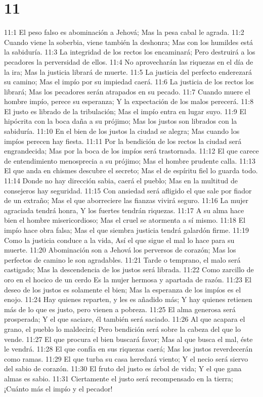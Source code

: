 \chapter{11}


11:1 El peso falso es abominación a Jehová;  
Mas la pesa cabal le agrada.  
11:2 Cuando viene la soberbia, viene también la deshonra;  
Mas con los humildes está la sabiduría.  
11:3 La integridad de los rectos los encaminará;  
Pero destruirá a los pecadores la perversidad de ellos.  
11:4 No aprovecharán las riquezas en el día de la ira;  
Mas la justicia librará de muerte.  
11:5 La justicia del perfecto enderezará su camino;  
Mas el impío por su impiedad caerá.  
11:6 La justicia de los rectos los librará;  
Mas los pecadores serán atrapados en su pecado.  
11:7 Cuando muere el hombre impío, perece su esperanza;  
Y la expectación de los malos perecerá.  
11:8 El justo es librado de la tribulación;  
Mas el impío entra en lugar suyo.  
11:9 El hipócrita con la boca daña a su prójimo;  
Mas los justos son librados con la sabiduría.  
11:10 En el bien de los justos la ciudad se alegra;  
Mas cuando los impíos perecen hay fiesta.  
11:11 Por la bendición de los rectos la ciudad será engrandecida;  
Mas por la boca de los impíos será trastornada.  
11:12 El que carece de entendimiento menosprecia a su prójimo;  
Mas el hombre prudente calla.  
11:13 El que anda en chismes descubre el secreto;  
Mas el de espíritu fiel lo guarda todo.  
11:14 Donde no hay dirección sabia, caerá el pueblo;  
Mas en la multitud de consejeros hay seguridad.  
11:15 Con ansiedad será afligido el que sale por fiador de un extraño;  
Mas el que aborreciere las fianzas vivirá seguro.  
11:16 La mujer agraciada tendrá honra,  
Y los fuertes tendrán riquezas.  
11:17 A su alma hace bien el hombre misericordioso;  
Mas el cruel se atormenta a sí mismo.  
11:18 El impío hace obra falsa;  
Mas el que siembra justicia tendrá galardón firme.  
11:19 Como la justicia conduce a la vida,  
Así el que sigue el mal lo hace para su muerte.  
11:20 Abominación son a Jehová los perversos de corazón; 
Mas los perfectos de camino le son agradables.  
11:21 Tarde o temprano, el malo será castigado;  
Mas la descendencia de los justos será librada.  
11:22 Como zarcillo de oro en el hocico de un cerdo  
Es la mujer hermosa y apartada de razón.  
11:23 El deseo de los justos es solamente el bien;  
Mas la esperanza de los impíos es el enojo.  
11:24 Hay quienes reparten, y les es añadido más;  
Y hay quienes retienen más de lo que es justo, pero vienen a pobreza.  
11:25 El alma generosa será prosperada;  
Y el que saciare, él también será saciado.  
11:26 Al que acapara el grano, el pueblo lo maldecirá;  
Pero bendición será sobre la cabeza del que lo vende.  
11:27 El que procura el bien buscará favor;  
Mas al que busca el mal, éste le vendrá.  
11:28 El que confía en sus riquezas caerá;  
Mas los justos reverdecerán como ramas.  
11:29 El que turba su casa heredará viento; 
Y el necio será siervo del sabio de corazón.  
11:30 El fruto del justo es árbol de vida;  
Y el que gana almas es sabio.  
11:31 Ciertamente el justo será recompensado en la tierra;  
¡Cuánto más el impío y el pecador!  

